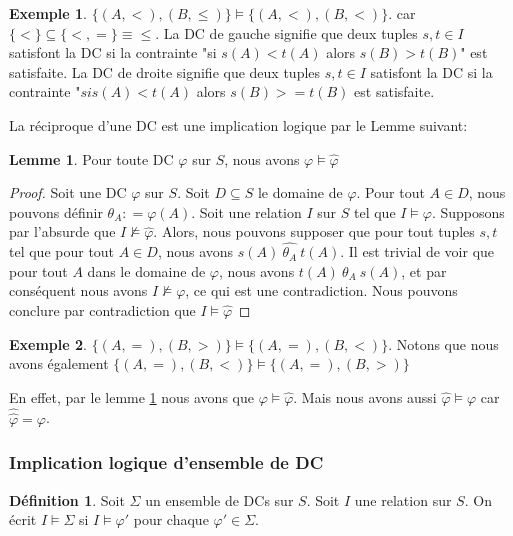 \documentclass[letterpaper, 12pt]{report}
\theoremstyle{definition}
\newtheorem{mydef}{Définition}
\newtheorem{mylemma}{Lemme}
\newtheorem{myexample}{Exemple}
\begin{document}
\begin{myexample}
 $\{(A,<),(B,\leq)\}\models\{(A,<),(B,<)\}$. car $\{<\} \subseteq \{<,=\} \equiv \leq$.
La DC de gauche signifie que deux tuples $s,t \in I$ satisfont la DC si la contrainte "si $s(A)<t(A)$ alors $s(B) > t(B)$" est satisfaite.
La DC de droite signifie que deux tuples $s,t \in I$ satisfont la DC si la contrainte "$si s(A)<t(A)$ alors $s(B) >= t(B)$ est satisfaite.
\end{myexample}

La réciproque d'une DC est une implication logique par le Lemme suivant:
\begin{mylemma}
\label{implicationReciproque}
Pour toute DC $\varphi$ sur $S$, nous avons $\varphi \models \hat{\varphi}$
\end{mylemma}

\begin{proof}

Soit une DC $\varphi$ sur $S$.
Soit $D\subseteq S$ le domaine de $\varphi$.
Pour tout $A\in D$, nous pouvons définir $\theta_{A}\mathrel{\mathop:}=\varphi(A)$.
Soit une relation $I$ sur $S$ tel que $I\models\varphi$.
Supposons par l'absurde que $I\not\models\hat{\varphi}$.
Alors, nous pouvons supposer que pour tout tuples $s,t$ tel que pour tout $A\in D$, nous avons $s(A)\ \hat{\theta_{A}}\ t(A)$.
Il est trivial de voir que pour tout $A$ dans le domaine de $\varphi$,
nous avons $t(A)\ \theta_{A}\ s(A)$, et par conséquent nous avons $I\not\models\varphi$, ce qui est une contradiction.
Nous pouvons conclure par contradiction que $I\models\hat{\varphi}$
\end{proof}

\begin{myexample}
$\{(A,=), (B,>)\}\models\{(A,=), (B,<)\}$. Notons que nous avons également $\{(A,=), (B,<)\} \models \{(A,=), (B,>)\}$
\end{myexample} 

En effet, par le lemme \ref{implicationReciproque}  nous avons que $\varphi \models \hat{\varphi}$. Mais nous avons aussi $\hat{\varphi} \models \varphi$ car $\hat{\hat{\varphi}} = \varphi$.

\subsubsection{Implication logique d'ensemble de DC}

\begin{mydef}
Soit $\Sigma$ un ensemble de DCs sur $S$. Soit $I$ une relation sur $S$. On écrit $I \models \Sigma$ si $I \models\varphi'$ pour chaque $\varphi' \in \Sigma$.
\end{mydef}
\end{document}
